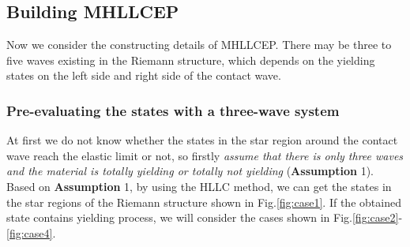 \documentclass[review]{elsarticle}
\begin{document}
\subsection{Building MHLLCEP}

Now we consider the constructing details of MHLLCEP. There may be three to five waves existing  in the Riemann structure, which depends on the yielding states  on the left side and right side of the contact wave.

\subsubsection{Pre-evaluating the states with a three-wave system}\label{sec:case1}
At first we do not know whether the states in the star region around the contact wave reach the elastic limit or not, so firstly \emph{assume that there is only three waves and the material is totally yielding or totally not yielding} (\textbf{Assumption} 1). Based on \textbf{Assumption} 1, by using the HLLC method, we can get the states in the star regions of the Riemann structure shown in  Fig.\ref{fig:case1}. If the obtained state contains yielding process, we will consider the cases shown in Fig.\ref{fig:case2}-\ref{fig:case4}.
\end{document}
